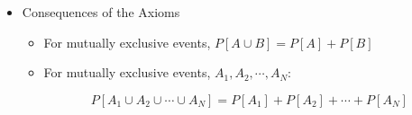 \begin{itemize}
\begin{itemize}
\begin{itemize}
        \end{itemize}

      \item Consequences of the Axioms

        \begin{itemize}

          \item For mutually exclusive events, $P[A\cup B]=P[A]+P[B]$

          \item For mutually exclusive events, $A_1, A_2, \cdots, A_N$:

            $$P[A_1\cup A_2\cup\cdots\cup A_N]=P[A_1]+P[A_2]+\cdots+P[A_N]$$

        \end{itemize}

    \end{itemize}

\end{itemize}



